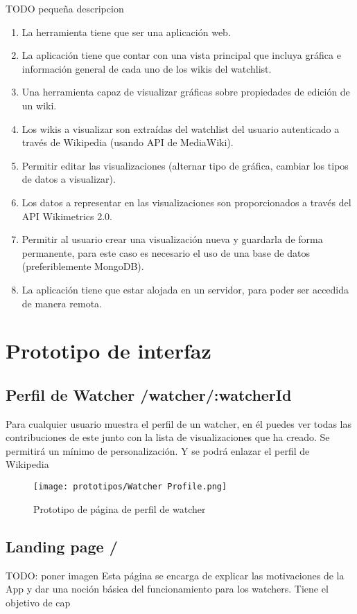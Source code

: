     TODO pequeña descripcion

\begin{enumerate}
    \item{La herramienta tiene que ser una aplicación web.}
    \item{La aplicación tiene que contar con una vista principal que incluya gráfica e información general de cada uno de los wikis del watchlist.}
    \item{Una herramienta capaz de visualizar gráficas sobre propiedades de edición de un wiki.}
    \item{Los wikis a visualizar son extraídas del watchlist del usuario autenticado a través de Wikipedia (usando API de MediaWiki).}
    \item{Permitir editar las visualizaciones (alternar tipo de gráfica, cambiar los tipos de datos a visualizar).}
    \item{Los datos a representar en las visualizaciones son proporcionados a través del API Wikimetrics 2.0.}
    \item{Permitir al usuario crear una visualización nueva y guardarla de forma permanente, para este caso es necesario el uso de una base de datos (preferiblemente MongoDB).}
    \item{La aplicación tiene que estar alojada en un servidor, para poder ser accedida de manera remota.}
\end{enumerate}

\section{Prototipo de interfaz}

\subsection{Perfil de Watcher /watcher/:watcherId}
Para cualquier usuario muestra el perfil de un watcher, en él puedes ver todas las contribuciones de este junto con la lista de visualizaciones que ha creado.
Se permitirá un mínimo de personalización. Y se podrá enlazar el perfil de Wikipedia

\begin{figure}[H]
    \centering
    \texttt{[image: prototipos/Watcher Profile.png]}
    \caption{Prototipo de página de perfil de watcher}
    \label{PrototipoWatchersProfile}
\end{figure}

\subsection{Landing page /}
TODO: poner imagen
Esta página se encarga de explicar las motivaciones de la App y dar una noción básica del funcionamiento para los watchers.
Tiene el objetivo de cap

